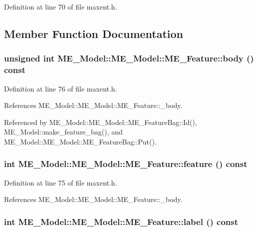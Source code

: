 Definition at line 70 of file maxent.h.

\subsection{Member Function Documentation}
\hypertarget{structME__Model_1_1ME__Feature_99e28a449267c9ccaacaa903c4147ec0}{
\subsubsection[{body}]{\setlength{\rightskip}{0pt plus 5cm}unsigned int ME\_\-Model::ME\_\-Model::ME\_\-Feature::body () const}}
\label{structME__Model_1_1ME__Feature_99e28a449267c9ccaacaa903c4147ec0}




Definition at line 76 of file maxent.h.

References ME\_\-Model::ME\_\-Model::ME\_\-Feature::\_\-body.

Referenced by ME\_\-Model::ME\_\-Model::ME\_\-FeatureBag::Id(), ME\_\-Model::make\_\-feature\_\-bag(), and ME\_\-Model::ME\_\-Model::ME\_\-FeatureBag::Put().\hypertarget{structME__Model_1_1ME__Feature_96e93b09b9d9778e302f78a66010e584}{
\subsubsection[{feature}]{\setlength{\rightskip}{0pt plus 5cm}int ME\_\-Model::ME\_\-Model::ME\_\-Feature::feature () const}}
\label{structME__Model_1_1ME__Feature_96e93b09b9d9778e302f78a66010e584}




Definition at line 75 of file maxent.h.

References ME\_\-Model::ME\_\-Model::ME\_\-Feature::\_\-body.\hypertarget{structME__Model_1_1ME__Feature_7357fa87b4d4760b2410d68bfb7e43c5}{
\subsubsection[{label}]{\setlength{\rightskip}{0pt plus 5cm}int ME\_\-Model::ME\_\-Model::ME\_\-Feature::label () const}}
\label{structME__Model_1_1ME__Feature_7357fa87b4d4760b2410d68bfb7e43c5}




